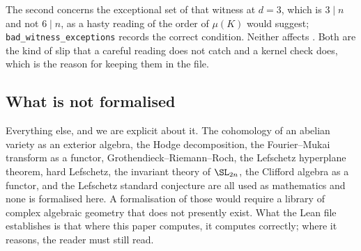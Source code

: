 The second concerns the exceptional set of that witness at $d=3$, which is
$3\mid n$ and not $6\mid n$, as a hasty reading of the order of $\mu(K)$
would suggest; \texttt{bad\_witness\_exceptions} records the correct
condition. Neither affects . Both are the kind of slip that
a careful reading does not catch and a kernel check does, which is the reason
for keeping them in the file.

\subsection{What is not formalised}

Everything else, and we are explicit about it. The cohomology of an abelian
variety as an exterior algebra, the Hodge decomposition, the Fourier--Mukai
transform as a functor, Grothendieck--Riemann--Roch, the Lefschetz hyperplane
theorem, hard Lefschetz, the invariant theory of $\SL_{2n}$, the Clifford
algebra as a functor, and the Lefschetz standard conjecture are all used as
mathematics and none is formalised here. A formalisation of those would
require a library of complex algebraic geometry that does not presently exist.
What the Lean file establishes is that where this paper computes, it computes
correctly; where it reasons, the reader must still read.
